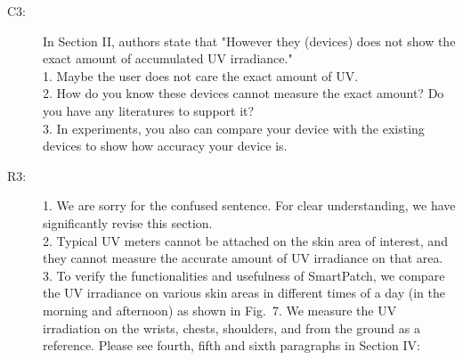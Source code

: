 \documentclass[onecolumn]{IEEEconf}
\begin{document}
\begin{description}
\item [C3: ] In Section II, authors state that "However they (devices) does not show the exact amount of accumulated UV irradiance." \\
1. Maybe the user does not care the exact amount of UV. \\
2. How do you know these devices cannot measure the exact amount? Do you have any literatures to support it?\\
3. In experiments, you also can compare your device with the existing devices to show how accuracy your device is.
\item [R3: ] 
%
1. We are sorry for the confused sentence. For clear understanding, we have significantly revise this section.\\
2. Typical UV meters cannot be attached on the skin area of interest, and they cannot measure the accurate amount of UV irradiance on that area.\\
3. To verify the functionalities and usefulness of SmartPatch, we compare the UV irradiance on various skin areas in different times of a day (in the morning and afternoon) as shown in Fig.~7. We measure the UV irradiation on the wrists, chests, shoulders, and from the ground as a reference. Please see fourth, fifth and sixth paragraphs in Section IV:\\


\end{description}
\end{document}

